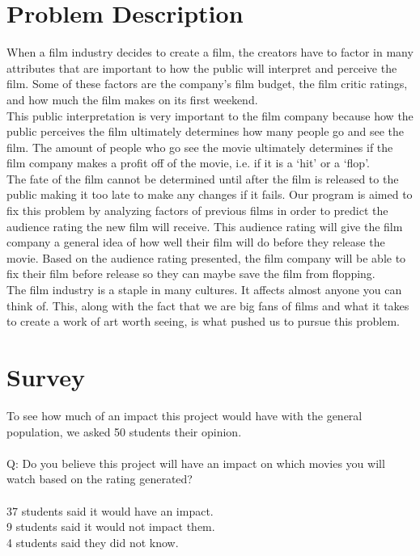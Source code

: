 \documentclass[10pt,twocolumn,letterpaper]{article}
\begin{document}
\section{Problem Description}
	When a film industry decides to create a film, the creators have to factor in many attributes that are important to how the public will interpret and perceive the film. Some of these factors are the company’s film budget, the film critic ratings, and how much the film makes on its first weekend.\\
	This public interpretation is very important to the film company because how the public perceives the film ultimately determines how many people go and see the film. The amount of people who go see the movie ultimately determines if the film company makes a profit off of the movie, i.e. if it is a ‘hit’ or a ‘flop’.\\
	The fate of the film cannot be determined until after the film is released to the public making it too late to make any changes if it fails. Our program is aimed to fix this problem by analyzing factors of previous films in order to predict the audience rating the new film will receive. This audience rating will give the film company a general idea of how well their film will do before they release the movie. Based on the audience rating presented, the film company will be able to fix their film before release so they can maybe save the film from flopping.\\ The film industry is a staple in many cultures. It affects almost anyone you can think of. This, along with the fact that we are big fans of films and what it takes to create a work of art worth seeing, is what pushed us to pursue this problem.

\section{Survey}
	To see how much of an impact this project would have with the general population, we asked 50 students their opinion.\\\\
	Q: Do you believe this project will have an impact on which movies you will watch based on the rating generated?\\\\
	37 students said it would have an impact.\\
	9 students said it would not impact them.\\
	4 students said they did not know.
\end{document}

